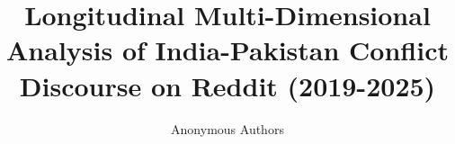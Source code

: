 \title{Longitudinal Multi-Dimensional Analysis of India-Pakistan Conflict Discourse on Reddit (2019-2025)}


\author{Anonymous Authors}



